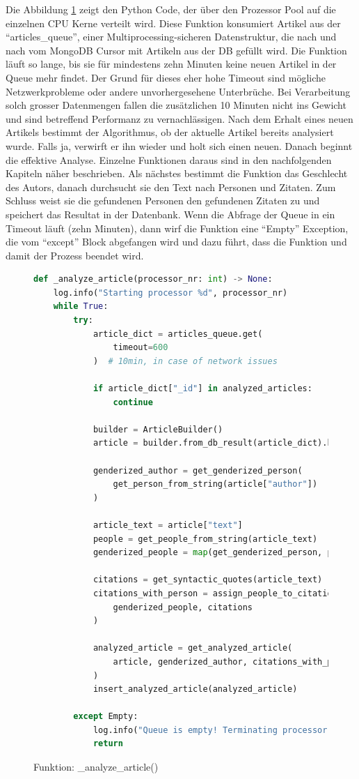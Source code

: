Die Abbildung \ref{aggregation-function} zeigt den Python Code,
der über den Prozessor Pool auf die einzelnen CPU Kerne verteilt wird.
Diese Funktion konsumiert Artikel aus der \enquote{articles\_queue},
einer Multiprocessing-sicheren Datenstruktur, die nach und nach vom
MongoDB Cursor mit Artikeln aus der DB gefüllt wird.
Die Funktion läuft so lange, bis sie für mindestens zehn Minuten
keine neuen Artikel in der Queue mehr findet. Der Grund für dieses eher hohe
Timeout sind mögliche Netzwerkprobleme oder andere unvorhergesehene
Unterbrüche. Bei Verarbeitung solch grosser Datenmengen fallen die
zusätzlichen 10 Minuten nicht ins Gewicht und sind betreffend
Performanz zu vernachlässigen.
Nach dem Erhalt eines neuen Artikels bestimmt der Algorithmus,
ob der aktuelle Artikel bereits analysiert wurde.
Falls ja, verwirft er ihn wieder und holt sich einen neuen.
Danach beginnt die effektive Analyse. Einzelne Funktionen daraus sind
in den nachfolgenden Kapiteln näher beschrieben.
Als nächstes bestimmt die Funktion das Geschlecht des Autors, danach durchsucht
sie den Text nach Personen und Zitaten. Zum Schluss weist sie
die gefundenen Personen den gefundenen Zitaten zu und speichert das
Resultat in der Datenbank.
Wenn die Abfrage der Queue in ein Timeout läuft (zehn Minuten), dann
wirf die Funktion eine \enquote{Empty} Exception, die vom \enquote{except}
Block abgefangen wird und dazu führt, dass die Funktion und damit der
Prozess beendet wird.

\begin{figure}[H]
    \begin{lstlisting}[language=Python]
def _analyze_article(processor_nr: int) -> None:
    log.info("Starting processor %d", processor_nr)
    while True:
        try:
            article_dict = articles_queue.get(
                timeout=600
            )  # 10min, in case of network issues

            if article_dict["_id"] in analyzed_articles:
                continue

            builder = ArticleBuilder()
            article = builder.from_db_result(article_dict).build()

            genderized_author = get_genderized_person(
                get_person_from_string(article["author"])
            )

            article_text = article["text"]
            people = get_people_from_string(article_text)
            genderized_people = map(get_genderized_person, people)

            citations = get_syntactic_quotes(article_text)
            citations_with_person = assign_people_to_citations(
                genderized_people, citations
            )

            analyzed_article = get_analyzed_article(
                article, genderized_author, citations_with_person
            )
            insert_analyzed_article(analyzed_article)

        except Empty:
            log.info("Queue is empty! Terminating processor %d!", processor_nr)
            return
    \end{lstlisting}
    \caption{Funktion: \_analyze\_article()}
    \label{aggregation-function}
\end{figure}

